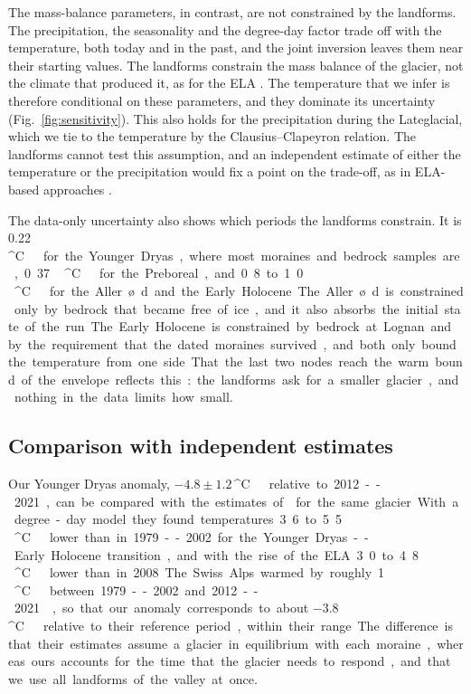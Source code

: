\documentclass[tc, manuscript]{copernicus}
\newcommand{\degC}{\unit{^{\circ}C}}
\begin{document}
The mass-balance parameters, in contrast, are not constrained by the landforms. The precipitation, the seasonality and the degree-day factor trade off with the temperature, both today and in the past, and the joint inversion leaves them near their starting values. The landforms constrain the mass balance of the glacier, not the climate that produced it, as for the ELA \citep{ohmura1992}. The temperature that we infer is therefore conditional on these parameters, and they dominate its uncertainty (Fig.~\ref{fig:sensitivity}). This also holds for the precipitation during the Lateglacial, which we tie to the temperature by the Clausius--Clapeyron relation. The landforms cannot test this assumption, and an independent estimate of either the temperature or the precipitation would fix a point on the trade-off, as in ELA-based approaches \citep{kerschner2000,rea2020}.

The data-only uncertainty also shows which periods the landforms constrain. It is 0.22\,\degC\ for the Younger Dryas, where most moraines and bedrock samples are, 0.37\,\degC\ for the Preboreal, and 0.8 to 1.0\,\degC\ for the Aller\o d and the Early Holocene. The Aller\o d is constrained only by bedrock that became free of ice, and it also absorbs the initial state of the run. The Early Holocene is constrained by bedrock at Lognan and by the requirement that the dated moraines survived, and both only bound the temperature from one side. That the last two nodes reach the warm bound of the envelope reflects this: the landforms ask for a smaller glacier, and nothing in the data limits how small.

\subsection{Comparison with independent estimates}
\label{sec:comparison}

Our Younger Dryas anomaly, $-4.8\pm1.2$\,\degC\ relative to 2012--2021, can be compared with the estimates of \citet{protin2019} for the same glacier. With a degree-day model they found temperatures 3.6 to 5.5\,\degC\ lower than in 1979--2002 for the Younger Dryas--Early Holocene transition, and with the rise of the ELA 3.0 to 4.8\,\degC\ lower than in 2008. The Swiss Alps warmed by roughly 1\,\degC\ between 1979--2002 and 2012--2021 \citep[e.g.][]{begert2018}, so that our anomaly corresponds to about $-3.8$\,\degC\ relative to their reference period, within their range. The difference is that their estimates assume a glacier in equilibrium with each moraine, whereas ours accounts for the time that the glacier needs to respond, and that we use all landforms of the valley at once.
\end{document}
